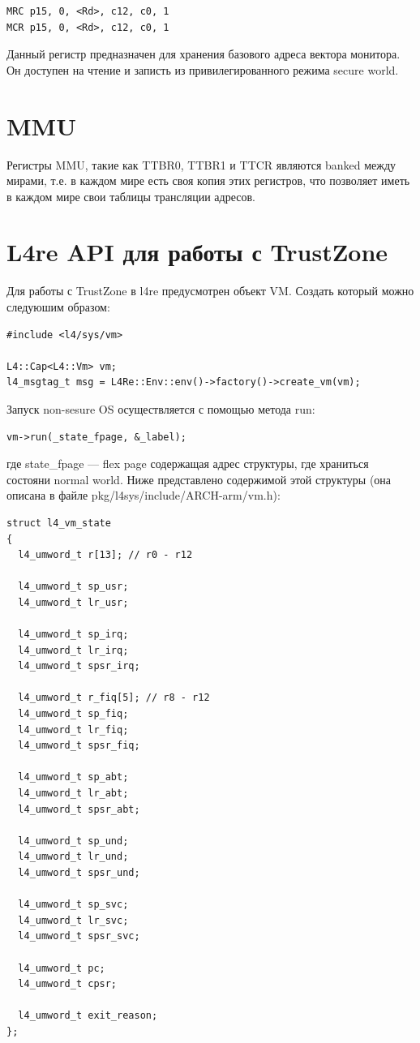 \documentclass[11pt]{article}
\begin{document}
\begin{verbatim}
MRC p15, 0, <Rd>, c12, c0, 1
MCR p15, 0, <Rd>, c12, c0, 1
\end{verbatim}

Данный регистр предназначен для хранения базового адреса вектора монитора. Он доступен
на чтение и записть из привилегированного режима secure world.


\section{MMU}

Регистры MMU, такие как TTBR0, TTBR1 и TTCR являются banked между мирами, т.е. 
в каждом мире есть своя копия этих регистров, что позволяет иметь в каждом мире
свои таблицы трансляции адресов.


\section{L4re API для работы с TrustZone}

Для работы с TrustZone в l4re предусмотрен объект VM.
Создать который можно следуюшим образом:

\begin{verbatim}
#include <l4/sys/vm>

L4::Cap<L4::Vm> vm;
l4_msgtag_t msg = L4Re::Env::env()->factory()->create_vm(vm);
\end{verbatim}

Запуск non-sesure OS осуществляется с помощью метода run:
\begin{verbatim}
vm->run(_state_fpage, &_label);
\end{verbatim}
где state\_fpage --- flex page содержащая адрес структуры, где храниться
состояни normal world. Ниже представлено содержимой этой структуры (она описана
в файле pkg/l4sys/include/ARCH-arm/vm.h):
\begin{verbatim}
struct l4_vm_state
{
  l4_umword_t r[13]; // r0 - r12

  l4_umword_t sp_usr;
  l4_umword_t lr_usr;

  l4_umword_t sp_irq;
  l4_umword_t lr_irq;
  l4_umword_t spsr_irq;

  l4_umword_t r_fiq[5]; // r8 - r12
  l4_umword_t sp_fiq;
  l4_umword_t lr_fiq;
  l4_umword_t spsr_fiq;

  l4_umword_t sp_abt;
  l4_umword_t lr_abt;
  l4_umword_t spsr_abt;

  l4_umword_t sp_und;
  l4_umword_t lr_und;
  l4_umword_t spsr_und;

  l4_umword_t sp_svc;
  l4_umword_t lr_svc;
  l4_umword_t spsr_svc;

  l4_umword_t pc;
  l4_umword_t cpsr;

  l4_umword_t exit_reason;
};
\end{verbatim}
\end{document}
